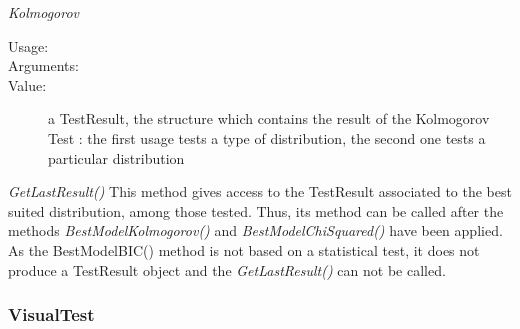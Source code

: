 \begin{description}
\begin{description}
\item \textit{Kolmogorov}
\begin{description}
\item[Usage:] \rule{0pt}{1em}
\item[Arguments:] \rule{0pt}{1em}
\item[Value:]  a TestResult, the structure which contains the result of the Kolmogorov Test : the first usage tests a type of distribution, the second one tests a particular distribution
\end{description}

\item \textit{GetLastResult()} This method gives access to the  TestResult associated to the best suited distribution, among those tested. Thus, its method can be called after the methods  \textit{BestModelKolmogorov()} and  \textit{BestModelChiSquared()} have been applied. As the BestModelBIC() method is not based on a statistical test, it does not produce a TestResult object and the \textit{GetLastResult()} can not be called.

\end{description}

\end{description}

\newpage
\subsubsection{VisualTest}
\label{visualtest}



